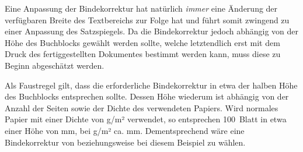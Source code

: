 \begin{Declaration*}{}
\begin{Declaration*}{}
\begin{Declaration*}{}
Eine Anpassung der Bindekorrektur hat natürlich \emph{immer} eine Änderung der 
verfügbaren Breite des Textbereichs zur Folge hat und führt somit zwingend zu 
einer Anpassung des Satzspiegels. Da die Bindekorrektur jedoch abhängig von der 
Höhe des Buchblocks gewählt werden sollte, welche letztendlich erst mit dem 
Druck des fertiggestellten Dokumentes bestimmt werden kann, muss diese zu 
Beginn abgeschätzt werden.
%
\begin{Example}
Als Faustregel gilt, dass die erforderliche Bindekorrektur in etwa der halben 
Höhe des Buchblocks entsprechen sollte. Dessen Höhe wiederum ist abhängig von 
der Anzahl der Seiten sowie der Dichte des verwendeten Papiers. Wird normales 
Papier mit einer Dichte von \unit[80]{g/m²} verwendet, so entsprechen 100~Blatt 
in etwa einer Höhe von \unit[10]{mm}, bei \unit[100]{g/m²} ca. \unit[12]{mm}. 
Dementsprechend wäre eine Bindekorrektur von  beziehungsweise 
 bei diesem Beispiel zu wählen.
%
\end{Example}



\end{Declaration*}
\end{Declaration*}
\end{Declaration*}
